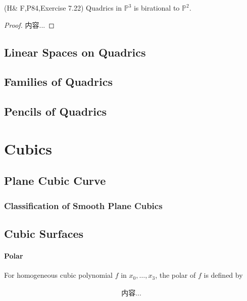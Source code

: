 \documentclass[Total.tex]{subfiles}
\begin{document}
			\begin{proposition}
				(H\& F,P84,Exercise 7.22) Quadrics in $\mathbb{P}^3$ is birational to $\mathbb{P}^2$.
			\end{proposition}
			
			\begin{proof}
				内容...
			\end{proof}
			
				
			
			\section{Linear Spaces on Quadrics}
			
			\section{Families of Quadrics}
			
			\section{Pencils of Quadrics}
		\chapter{Cubics}
			\section{Plane Cubic Curve}
			
				\subsection{Classification of Smooth Plane Cubics}
		
			\section{Cubic Surfaces}
			
				\subsubsection{Polar}
				
					\begin{Def}
						For homogeneous cubic polynomial $f$ in $x_0,\dots,x_3$, the polar of $f$ is defined by
						
						\begin{gather*}
							内容...
						\end{gather*}
					\end{Def}
					
\end{document}
